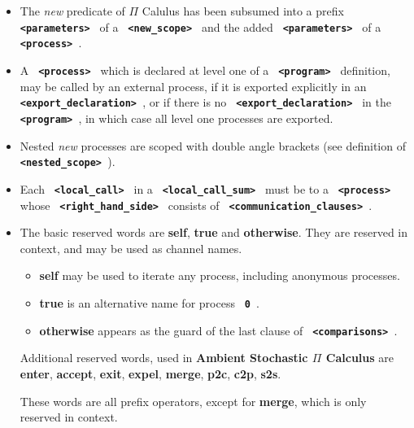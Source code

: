 \documentclass[twoside,10pt]{report}
\begin{document}
\begin{itemize}

\item
The {\em new} predicate of $\Pi$ Calulus has been subsumed into a prefix
{\bf \verb+ <parameters> +} \linebreak of a {\bf \verb+ <new_scope> +}
and the added {\bf \verb+ <parameters> +} of a \linebreak
{\bf \verb+ <process> +}.

\item
A {\bf \verb+ <process> +} which is declared at level one of a
{\bf \verb+ <program> +} definition, may be called by an external process,
if it is exported explicitly in an {\bf \verb+ <export_declaration> +},
or if there is no {\bf \verb+ <export_declaration> +} \linebreak in the
{\bf \verb+ <program> +},
in which case all level one processes are exported.

\item
Nested  {\em new} processes are scoped with double angle brackets (see
definition of {\bf \verb+ <nested_scope> +}).

\item
Each {\bf \verb+ <local_call> +} in a {\bf \verb+ <local_call_sum> +} must be
to a {\bf \verb+ <process> +} \linebreak
whose {\bf \verb+ <right_hand_side> +} consists
of {\bf \verb+ <communication_clauses> +}.

\item
The basic reserved words are {\bf self}, {\bf true} and
{\bf otherwise}.
They are reserved in context, and may be used as channel names.

\begin{itemize}
\item
{\bf self} may be used to iterate any process, including anonymous processes.
\item
{\bf true} is an alternative name for process {\bf \verb+ 0 +}.
\item
{\bf otherwise} appears as the guard of the last clause of
{\bf \verb+ <comparisons> +}.
\end{itemize}

\noindent
Additional reserved words, used in {\bf Ambient Stochastic $\Pi$ Calculus}
are {\bf enter}, {\bf accept},
{\bf exit}, {\bf expel}, {\bf merge}, {\bf p2c}, {\bf c2p}, {\bf s2s}.

These words are all prefix operators, except for {\bf merge}, which
is only reserved in context.


\end{itemize}
\end{document}

